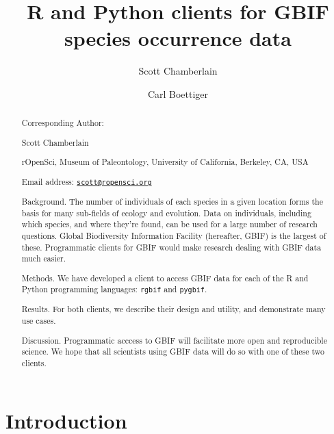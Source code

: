 \documentclass[author-year, review, 11pt]{components/elsarticle} %
\begin{document}
\begin{frontmatter}

  \title{R and Python clients for GBIF species occurrence data}
    \author[cstar]{Scott Chamberlain}
    \author[boettig]{Carl Boettiger}
  
      \address[cstar]{rOpenSci, Museum of Paleontology, University of California, Berkeley,
CA, USA}
    \address[boettig]{rOpenSci, Department of Enivornmental Science, Policy and Management,
University of California, Berkeley, CA, USA}
  
  \begin{abstract}
  Corresponding Author:
  
  Scott Chamberlain
  
  rOpenSci, Museum of Paleontology, University of California, Berkeley,
  CA, USA
  
  Email address:
  \href{mailto:scott@ropensci.org}{\href{mailto:scott@ropensci.org}{\nolinkurl{scott@ropensci.org}}}
  
  \newpage
  
  Background. The number of individuals of each species in a given
  location forms the basis for many sub-fields of ecology and evolution.
  Data on individuals, including which species, and where they're found,
  can be used for a large number of research questions. Global
  Biodiversity Information Facility (hereafter, GBIF) is the largest of
  these. Programmatic clients for GBIF would make research dealing with
  GBIF data much easier.
  
  Methods. We have developed a client to access GBIF data for each of the
  R and Python programming languages: \texttt{rgbif} and \texttt{pygbif}.
  
  Results. For both clients, we describe their design and utility, and
  demonstrate many use cases.
  
  Discussion. Programmatic acccess to GBIF will facilitate more open and
  reproducible science. We hope that all scientists using GBIF data will
  do so with one of these two clients.
  \end{abstract}
  
 \end{frontmatter}


\newpage

\section{Introduction}\label{introduction}
\end{document}

